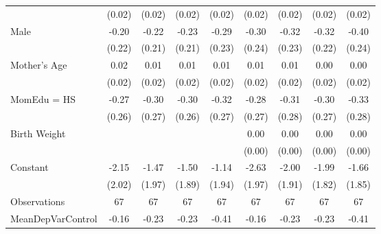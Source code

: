 {\begin{tabular}{l*{8}{c}}
                    &      (0.02)         &      (0.02)         &      (0.02)         &      (0.02)         &      (0.02)         &      (0.02)         &      (0.02)         &      (0.02)         \\
[1em]
Male                &       -0.20         &       -0.22         &       -0.23         &       -0.29         &       -0.30         &       -0.32         &       -0.32         &       -0.40         \\
                    &      (0.22)         &      (0.21)         &      (0.21)         &      (0.23)         &      (0.24)         &      (0.23)         &      (0.22)         &      (0.24)         \\
[1em]
Mother's Age        &        0.02         &        0.01         &        0.01         &        0.01         &        0.01         &        0.01         &        0.00         &        0.00         \\
                    &      (0.02)         &      (0.02)         &      (0.02)         &      (0.02)         &      (0.02)         &      (0.02)         &      (0.02)         &      (0.02)         \\
[1em]
MomEdu = HS         &       -0.27         &       -0.30         &       -0.30         &       -0.32         &       -0.28         &       -0.31         &       -0.30         &       -0.33         \\
                    &      (0.26)         &      (0.27)         &      (0.26)         &      (0.27)         &      (0.27)         &      (0.28)         &      (0.27)         &      (0.28)         \\
[1em]
Birth Weight        &                     &                     &                     &                     &        0.00         &        0.00         &        0.00         &        0.00         \\
                    &                     &                     &                     &                     &      (0.00)         &      (0.00)         &      (0.00)         &      (0.00)         \\
[1em]
Constant            &       -2.15         &       -1.47         &       -1.50         &       -1.14         &       -2.63         &       -2.00         &       -1.99         &       -1.66         \\
                    &      (2.02)         &      (1.97)         &      (1.89)         &      (1.94)         &      (1.97)         &      (1.91)         &      (1.82)         &      (1.85)         \\
\hline
Observations        &          67         &          67         &          67         &          67         &          67         &          67         &          67         &          67         \\
MeanDepVarControl   &       -0.16         &       -0.23         &       -0.23         &       -0.41         &       -0.16         &       -0.23         &       -0.23         &       -0.41         \\
\hline\hline
\end{tabular}
}
